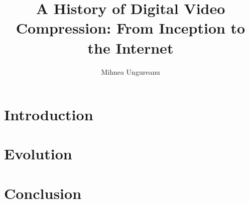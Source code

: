 \documentclass[12pt]{report}
\title{
    {A History of Digital Video Compression: From Inception to the Internet}
}
\author{Mihnea Ungureanu}
\begin{document}
\maketitle

\tableofcontents

\chapter{Introduction}


\chapter{Evolution}


\chapter{Conclusion}



\end{document}
